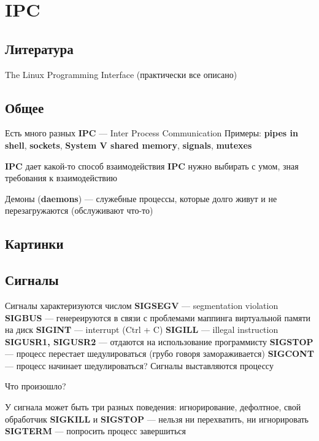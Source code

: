 \chapter{IPC}


\section{Литература}
The Linux Programming Interface (практически все описано)

\section{Общее}
Есть много разных \textbf{IPC} --- Inter Process Communication
Примеры: \textbf{pipes in shell}, \textbf{sockets}, \textbf{System V shared memory},
\textbf{signals}, \textbf{mutexes}

\textbf{IPC} дает какой-то способ взаимодействия
\textbf{IPC} нужно выбирать с умом, зная требования к взаимодействию

Демоны (\textbf{daemons}) --- служебные процессы, которые долго живут 
и не перезагружаются (обслуживают что-то)

\section{Картинки}

\section{Сигналы}
Сигналы характеризуются числом
\textbf{SIGSEGV} --- segmentation violation
\textbf{SIGBUS} --- генереируются в связи с проблемами маппинга виртуальной памяти на диск
\textbf{SIGINT} --- interrupt (Ctrl + C)
\textbf{SIGILL} --- illegal instruction
\textbf{SIGUSR1, SIGUSR2} --- отдаются на использование программисту
\textbf{SIGSTOP} --- процесс перестает шедулироваться (грубо говоря замораживается)
\textbf{SIGCONT} --- процесс начинает шедулироваться?
Сигналы выставляются процессу

Что произошло?

У сигнала может быть три разных поведения: игнорирование, дефолтное, свой обработчик
\textbf{SIGKILL} и \textbf{SIGSTOP} --- нельзя ни перехватить, ни игнорировать
\textbf{SIGTERM} --- попросить процесс завершиться

